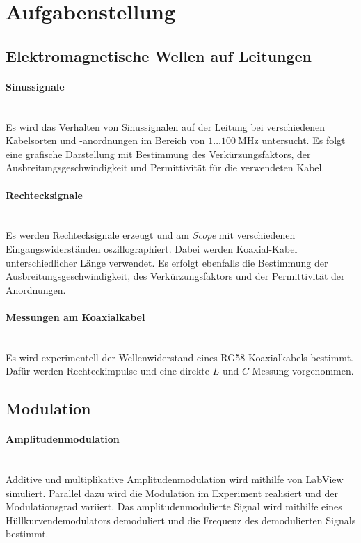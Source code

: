 \documentclass[a4paper,twoside,final]{article}
\begin{document}
\section{Aufgabenstellung} \label{sec:Aufgabenstellung}
\subsection{Elektromagnetische Wellen auf Leitungen}
\paragraph{Sinussignale}$~$\\
Es wird das Verhalten von Sinussignalen auf der Leitung bei verschiedenen Kabelsorten und -anordnungen im Bereich von $1\hdots\SI{100}{\mega\hertz}$ untersucht. Es folgt eine grafische Darstellung mit Bestimmung des Verkürzungsfaktors, der Ausbreitungsgeschwindigkeit und Permittivität für die verwendeten Kabel.
\paragraph{Rechtecksignale}$~$\\
Es werden Rechtecksignale erzeugt und am \textit{Scope} mit verschiedenen Eingangswiderständen oszillographiert. Dabei werden Koaxial-Kabel unterschiedlicher Länge verwendet. Es erfolgt ebenfalls die Bestimmung der Ausbreitungsgeschwindigkeit, des Verkürzungsfaktors und der Permittivität der Anordnungen.
\paragraph{Messungen am Koaxialkabel}$~$\\
Es wird experimentell der Wellenwiderstand eines RG58 Koaxialkabels bestimmt. Dafür werden Rechteckimpulse und eine direkte $L$ und $C$-Messung vorgenommen.

\subsection{Modulation}
\paragraph{Amplitudenmodulation}$~$\\
Additive und multiplikative Amplitudenmodulation wird mithilfe von LabView simuliert. Parallel dazu wird die Modulation im Experiment realisiert und der Modulationsgrad variiert. Das amplitudenmodulierte Signal wird mithilfe eines Hüllkurvendemodulators demoduliert und die Frequenz des demodulierten Signals bestimmt.
\end{document}
